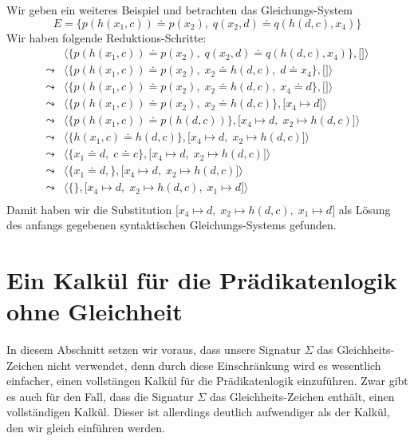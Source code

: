 \example
Wir geben ein weiteres Beispiel und betrachten das Gleichungs-System 
\[ E = \big\{ p(h(x_1,c)) \doteq p(x_2),\; q(x_2, d) \doteq q(h(d,c),x_4) \big\} \]
Wir haben folgende Reduktions-Schritte:
$$
\begin{array}{ll}
          & \big\langle \big\{ p(h(x_1,c)) \doteq p(x_2),\; q(x_2, d) \doteq q(h(d,c),x_4) \big\}, \big[ \big] \big\rangle \\[0.2cm]
 \leadsto & \big\langle \big\{ p(h(x_1,c)) \doteq p(x_2),\; x_2 \doteq h(d,c), \; d \doteq x_4 \big\}, \big[ \big] \big\rangle \\[0.2cm]
 \leadsto & \big\langle \big\{ p(h(x_1,c)) \doteq p(x_2),\; x_2 \doteq h(d,c), \; x_4 \doteq d \big\}, \big[ \big] \big\rangle \\[0.2cm]
 \leadsto & \big\langle \big\{ p(h(x_1,c)) \doteq p(x_2),\; x_2 \doteq h(d,c) \big\}, \big[ x_4 \mapsto d \big] \big\rangle \\[0.2cm]
 \leadsto & \big\langle \big\{ p(h(x_1,c)) \doteq p(h(d,c)) \big\}, \big[ x_4 \mapsto d,\; x_2 \mapsto h(d,c) \big] \big\rangle \\[0.2cm]
 \leadsto & \big\langle \big\{ h(x_1,c) \doteq h(d,c) \big\}, \big[ x_4 \mapsto d,\; x_2 \mapsto h(d,c) \big] \big\rangle \\[0.2cm]
 \leadsto & \big\langle \big\{ x_1 \doteq d,\; c \doteq c \big\}, \big[ x_4 \mapsto d,\; x_2 \mapsto h(d,c) \big] \big\rangle \\[0.2cm]
 \leadsto & \big\langle \big\{ x_1 \doteq d,\big\}, \big[ x_4 \mapsto d,\; x_2 \mapsto h(d,c) \big] \big\rangle \\[0.2cm]
 \leadsto & \big\langle \big\{\big\}, \big[ x_4 \mapsto d,\; x_2 \mapsto h(d,c),\; x_1 \mapsto d \big] \big\rangle \\[0.2cm]
\end{array}
$$
Damit haben wir die Substitution  $\big[ x_4 \mapsto d,\; x_2 \mapsto h(d,c),\; x_1 \mapsto d \big]$ als Lösung 
des anfangs gegebenen syn\-tak\-tischen Gleichungs-Systems gefunden.  
\eox




\section{Ein Kalkül für die Prädikatenlogik ohne Gleichheit}
In diesem Abschnitt setzen wir voraus, dass unsere Signatur $\Sigma$ das Gleichheits-Zeichen nicht
verwendet, denn durch diese Einschränkung wird es wesentlich einfacher, einen vollstängen Kalkül für
die Prädikatenlogik einzuführen.  Zwar gibt es auch für den Fall, dass die Signatur $\Sigma$ das
Gleichheits-Zeichen enthält, einen vollständigen Kalkül.  Dieser ist allerdings deutlich
aufwendiger als der Kalkül, den wir gleich einführen werden.

